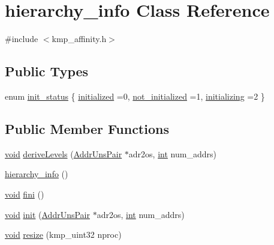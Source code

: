 \hypertarget{classhierarchy__info}{\section{hierarchy\-\_\-info Class Reference}
\label{classhierarchy__info}
}


{\ttfamily \#include $<$kmp\-\_\-affinity.\-h$>$}

\subsection*{Public Types}
\begin{DoxyCompactItemize}
\item 
enum \hyperlink{classhierarchy__info_a72afd05b52405fca73987c898caaf5b1}{init\-\_\-status} \{ \hyperlink{classhierarchy__info_a72afd05b52405fca73987c898caaf5b1a62492b533e6c2a820622602a0291dede}{initialized} =0, 
\hyperlink{classhierarchy__info_a72afd05b52405fca73987c898caaf5b1ac0a8e5f501a8d2ecb151b0d46d71add8}{not\-\_\-initialized} =1, 
\hyperlink{classhierarchy__info_a72afd05b52405fca73987c898caaf5b1ad3f87952fafc2375cad49ce25e04351c}{initializing} =2
 \}
\end{DoxyCompactItemize}
\subsection*{Public Member Functions}
\begin{DoxyCompactItemize}
\item 
\hyperlink{ittnotify__static_8h_af941d56e55e3c5465135b60c4d6343ed}{void} \hyperlink{classhierarchy__info_ab7d03fbfa83490719f2819e2e8149231}{derive\-Levels} (\hyperlink{classAddrUnsPair}{Addr\-Uns\-Pair} $\ast$adr2os, \hyperlink{ittnotify__static_8h_a8b8dcd723308a8cb5d84277c7a3fff70}{int} num\-\_\-addrs)
\item 
\hyperlink{classhierarchy__info_a0d804a7dc9dae10488df076742c06420}{hierarchy\-\_\-info} ()
\item 
\hyperlink{ittnotify__static_8h_af941d56e55e3c5465135b60c4d6343ed}{void} \hyperlink{classhierarchy__info_a6bd94261d14cd3644006557a49cd4a11}{fini} ()
\item 
\hyperlink{ittnotify__static_8h_af941d56e55e3c5465135b60c4d6343ed}{void} \hyperlink{classhierarchy__info_a812ad40d00a154a8ecdee9e9daa546a5}{init} (\hyperlink{classAddrUnsPair}{Addr\-Uns\-Pair} $\ast$adr2os, \hyperlink{ittnotify__static_8h_a8b8dcd723308a8cb5d84277c7a3fff70}{int} num\-\_\-addrs)
\item 
\hyperlink{ittnotify__static_8h_af941d56e55e3c5465135b60c4d6343ed}{void} \hyperlink{classhierarchy__info_a85116254d0daac14aa741e3cdb213f8b}{resize} (kmp\-\_\-uint32 nproc)
\end{DoxyCompactItemize}
